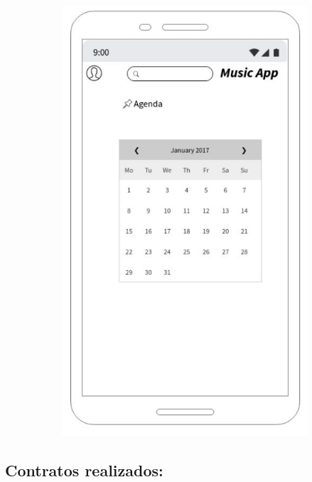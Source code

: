 \begin{figure}[hbt!]
 \centering
\includegraphics[width=12cm, height=16cm,keepaspectratio=true]{Desarrollo/Interfaces/imgs/wire5.JPG}
\end{figure}
\newpage
\subsection{Contratos realizados:}

